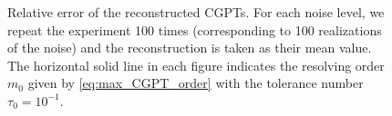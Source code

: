 
\begin{figure}[htp]
  \centering
  \caption{Relative error of the reconstructed CGPTs. For each noise
    level, we repeat the experiment 100 times (corresponding to 100 realizations of the noise) and the
    reconstruction is taken as their mean value. The horizontal solid
    line in each figure indicates the resolving order $m_0$ given by
    \eqref{eq:max_CGPT_order} with the tolerance number $\tau_0=10^{-1}$.}
  \label{fig:err_rec_CGPT}
\end{figure}

